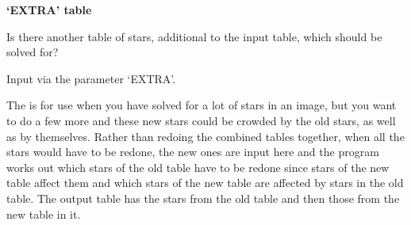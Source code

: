 \begin{small}
{{ {\bf \hspace*{1em} `EXTRA' table}
 
   Is there another table of stars, additional to the input table,
   which should be solved for?
 
   Input via the parameter `EXTRA'.
 
   The is for use when you have solved for a lot of stars in an image,
   but you want to do a few more and these new stars could be crowded
   by the old stars, as well as by themselves. Rather than redoing the
   combined tables together, when all the stars would have to be
   redone, the new ones are input here and the program works out which
   stars of the old table have to be redone since stars of the new
   table affect them and which stars of the new table are affected by
   stars in the old table. The output table has the stars from the old
   table and then those from the new table in it.
 
}}
\end{small}
